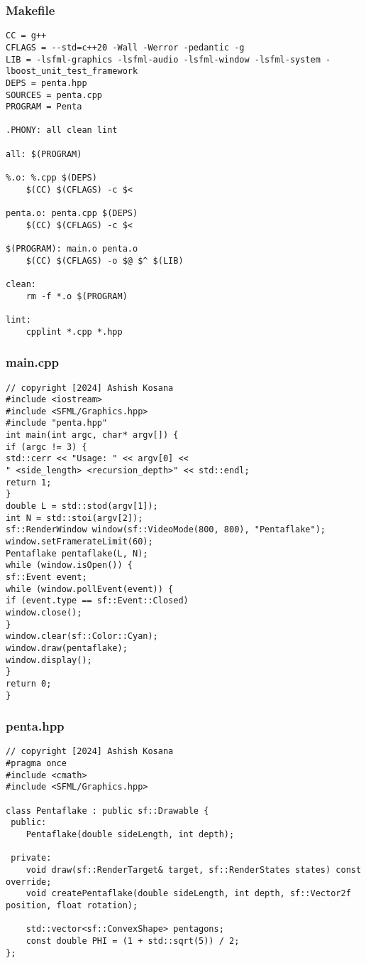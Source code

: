 \documentclass[12pt]{article}
\begin{document}
\subsubsection{Makefile}
\begin{lstlisting}[style=cppcode]
CC = g++
CFLAGS = --std=c++20 -Wall -Werror -pedantic -g
LIB = -lsfml-graphics -lsfml-audio -lsfml-window -lsfml-system -lboost_unit_test_framework
DEPS = penta.hpp
SOURCES = penta.cpp
PROGRAM = Penta

.PHONY: all clean lint

all: $(PROGRAM)

%.o: %.cpp $(DEPS)
	$(CC) $(CFLAGS) -c $<

penta.o: penta.cpp $(DEPS)
	$(CC) $(CFLAGS) -c $<

$(PROGRAM): main.o penta.o
	$(CC) $(CFLAGS) -o $@ $^ $(LIB)

clean:
	rm -f *.o $(PROGRAM)

lint:
	cpplint *.cpp *.hpp
\end{lstlisting}
\newpage
\subsubsection{main.cpp}
\begin{lstlisting}[style=cppcode]
// copyright [2024] Ashish Kosana
#include <iostream>
#include <SFML/Graphics.hpp>
#include "penta.hpp"
int main(int argc, char* argv[]) {
if (argc != 3) {
std::cerr << "Usage: " << argv[0] <<
" <side_length> <recursion_depth>" << std::endl;
return 1;
}
double L = std::stod(argv[1]);
int N = std::stoi(argv[2]);
sf::RenderWindow window(sf::VideoMode(800, 800), "Pentaflake");
window.setFramerateLimit(60);
Pentaflake pentaflake(L, N);
while (window.isOpen()) {
sf::Event event;
while (window.pollEvent(event)) {
if (event.type == sf::Event::Closed)
window.close();
}
window.clear(sf::Color::Cyan);
window.draw(pentaflake);
window.display();
}
return 0;
}
\end{lstlisting}
\subsubsection{penta.hpp}
\begin{lstlisting}[style=cppcode]
// copyright [2024] Ashish Kosana
#pragma once
#include <cmath>
#include <SFML/Graphics.hpp>

class Pentaflake : public sf::Drawable {
 public:
    Pentaflake(double sideLength, int depth);

 private:
    void draw(sf::RenderTarget& target, sf::RenderStates states) const override;
    void createPentaflake(double sideLength, int depth, sf::Vector2f position, float rotation);

    std::vector<sf::ConvexShape> pentagons;
    const double PHI = (1 + std::sqrt(5)) / 2;
};
\end{lstlisting}
\end{document}
